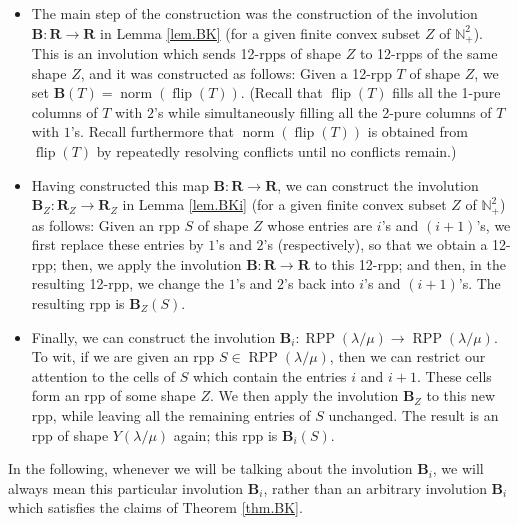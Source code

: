 \documentclass[numbers=enddot,12pt,final,onecolumn,notitlepage]{scrartcl}%
\theoremstyle{definition}
\begin{document}
\begin{itemize}
\item The main step of the construction was the construction of the involution
$\mathbf{B}:\mathbf{R}\rightarrow\mathbf{R}$ in Lemma \ref{lem.BK} (for a
given finite convex subset $Z$ of $\mathbb{N}_{+}^{2}$). This is an involution
which sends 12-rpps of shape $Z$ to 12-rpps of the same shape $Z$, and it was
constructed as follows: Given a 12-rpp $T$ of shape $Z$, we set $\mathbf{B}%
\left(  T\right)  =\operatorname*{norm}\left(  \operatorname*{flip}\left(
T\right)  \right)  $. (Recall that $\operatorname*{flip}\left(  T\right)  $
fills all the 1-pure columns of $T$ with $2$'s while simultaneously filling
all the 2-pure columns of $T$ with $1$'s. Recall furthermore that
$\operatorname*{norm}\left(  \operatorname*{flip}\left(  T\right)  \right)  $
is obtained from $\operatorname*{flip}\left(  T\right)  $ by repeatedly
resolving conflicts until no conflicts remain.)

\item Having constructed this map $\mathbf{B}:\mathbf{R}\rightarrow\mathbf{R}%
$, we can construct the involution $\mathbf{B}_{Z}:\mathbf{R}_{Z}%
\rightarrow\mathbf{R}_{Z}$ in Lemma \ref{lem.BKi} (for a given finite convex
subset $Z$ of $\mathbb{N}_{+}^{2}$) as follows: Given an rpp $S$ of shape $Z$
whose entries are $i$'s and $\left(  i+1\right)  $'s, we first replace these
entries by $1$'s and $2$'s (respectively), so that we obtain a 12-rpp; then,
we apply the involution $\mathbf{B}:\mathbf{R}\rightarrow\mathbf{R}$ to this
12-rpp; and then, in the resulting 12-rpp, we change the $1$'s and $2$'s back
into $i$'s and $\left(  i+1\right)  $'s. The resulting rpp is $\mathbf{B}%
_{Z}\left(  S\right)  $.

\item Finally, we can construct the involution $\mathbf{B}_{i}%
:\operatorname*{RPP}\left(  \lambda/\mu\right)  \rightarrow\operatorname*{RPP}%
\left(  \lambda/\mu\right)  $. To wit, if we are given an rpp $S\in
\operatorname*{RPP}\left(  \lambda/\mu\right)  $, then we can restrict our
attention to the cells of $S$ which contain the entries $i$ and $i+1$. These
cells form an rpp of some shape $Z$. We then apply the involution
$\mathbf{B}_{Z}$ to this new rpp, while leaving all the remaining entries of
$S$ unchanged. The result is an rpp of shape $Y\left(  \lambda/\mu\right)  $
again; this rpp is $\mathbf{B}_{i}\left(  S\right)  $.
\end{itemize}

In the following, whenever we will be talking about the involution
$\mathbf{B}_{i}$, we will always mean this particular involution
$\mathbf{B}_{i}$, rather than an arbitrary involution $\mathbf{B}_{i}$ which
satisfies the claims of Theorem \ref{thm.BK}.
\end{document}
